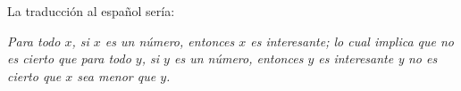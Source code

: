 \begin{solution}
    La traducción al español sería:

    \textit{Para todo $x$, si $x$ es un número, entonces $x$ es interesante; lo cual implica que no es cierto que para todo $y$, si $y$ es un número, entonces $y$ es interesante y no es cierto que $x$ sea menor que $y$.}


\end{solution}